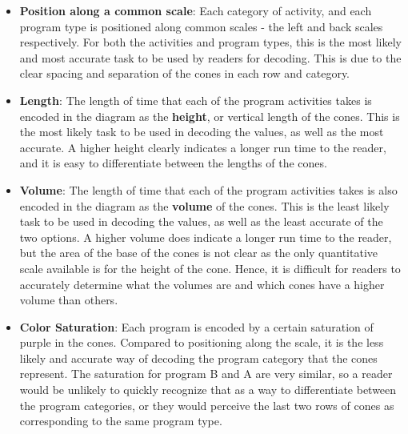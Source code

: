 \documentclass[9pt,letter]{article}
\begin{document}
\begin{enumerate}
\begin{enumerate}
    \begin{itemize}
    \item \textbf{Position along a common scale}: Each category of activity, and each program type is positioned along common scales - the left and back scales respectively. For both the activities and program types, this is the most likely and most accurate task to be used by readers for decoding. This is due to the clear spacing and separation of the cones in each row and category.
    \item \textbf{Length}: The length of time that each of the program activities takes is encoded in the diagram as the \textbf{height}, or vertical length of the cones. This is the most likely task to be used in decoding the values, as well as the most accurate. A higher height clearly indicates a longer run time to the reader, and it is easy to differentiate between the lengths of the cones.
    \item \textbf{Volume}: The length of time that each of the program activities takes is also encoded in the diagram as the \textbf{volume} of the cones. This is the least likely task to be used in decoding the values, as well as the least accurate of the two options. A higher volume does indicate a longer run time to the reader, but the area of the base of the cones is not clear as the only quantitative scale available is for the height of the cone. Hence, it is difficult for readers to accurately determine what the volumes are and which cones have a higher volume than others.
    \item \textbf{Color Saturation}: Each program is encoded by a certain saturation of purple in the cones. Compared to positioning along the scale, it is the less likely and accurate way of decoding the program category that the cones represent. The saturation for program B and A are very similar, so a reader would be unlikely to quickly recognize that as a way to differentiate between the program categories, or they would perceive the last two rows of cones as corresponding to the same program type.
    \end{itemize}


\end{enumerate}
\end{enumerate}
\end{document}
